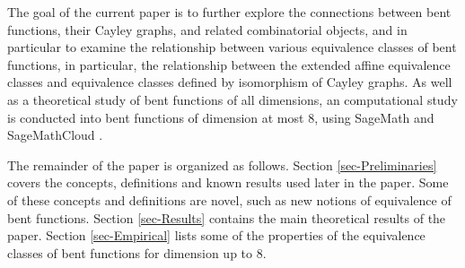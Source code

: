 \documentclass[12pt,a4paper]{article}
\newcommand{\mb}[1]{\mathbb{#1}}
\newcommand{\F}{\mb{F}}
\newtheorem{Theorem}{Theorem}
\begin{document}
The goal of the current paper is to further explore the connections between bent functions, their
Cayley graphs, and related combinatorial objects,
and in particular to examine the relationship between various equivalence classes of bent
functions, in particular, the relationship between the extended affine
equivalence classes and equivalence classes defined by isomorphism of Cayley graphs.
As well as a theoretical study of bent functions of all dimensions, an computational study is conducted
into bent functions of dimension at most 8,
using SageMath \cite{SageMath7517} and Sage\-Math\-Cloud \cite{SageMathCloud}.


%
%
The remainder of the paper is organized as follows.
Section \ref{sec-Preliminaries} covers the concepts, definitions and known results used later in the paper.
Some of these concepts and definitions are novel, such as new notions of equivalence of bent
functions.
Section \ref{sec-Results} contains the main theoretical results of the paper.
Section \ref{sec-Empirical} lists some of the properties of the equivalence classes of bent functions for dimension up to 8.
\end{document}
